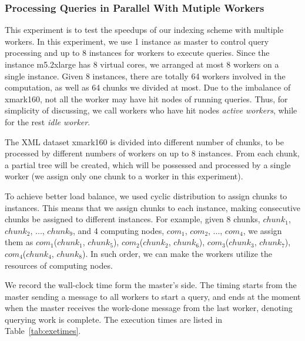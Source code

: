 \subsubsection{Processing Queries in Parallel With Mutiple Workers}

This experiment is to test the speedups of our indexing scheme with multiple
workers. In this experiment, we use 1 instance as master to control query
processing and up to 8 instances for workers to execute queries. Since the
instance m5.2xlarge has 8 virtual cores, we arranged at most 8 workers on a
single instance. Given 8 instances, there are totally 64 workers involved in the
computation, as well as 64 chunks we divided at most. Due to the imbalance of
xmark160, not all the worker may have hit nodes of running queries. Thus, for
simplicity of discussing, we call workers who have hit nodes \emph{active
	workers}, while for the rest \emph{idle worker}. 

The XML dataset xmark160 is divided into different number of chunks, to be
processed by different numbers of workers on up to 8 instances. From each chunk,
a partial tree will be created, which will be possessed and processed by a
single worker (we assign only one chunk to a worker in this experiment). 

To achieve better load balance, we used cyclic distribution to assign chunks to
instances. This means that we assign chunks to each instance, making consecutive
chunks be assigned to different instances. For example, given 8 chunks, $chunk_1$,
$chunk_2$, ..., $chunk_9$, and 4 computing nodes, $com_1$, $com_2$, ..., $com_4$, 
we assign them as 
$com_1$($chunk_1$, $chunk_5$), 
$com_2$($chunk_2$, $chunk_6$), 
$com_3$($chunk_3$, $chunk_7$), 
$com_4$($chunk_4$, $chunk_8$). 
In such order, we can make the workers utilize the resources of computing nodes. 

We record the wall-clock time form the master's side. The timing starts from the
master sending a message to all workers to start a query, and ends at the moment
when the master receives the work-done message from the last worker, denoting
querying work is complete. The execution times are listed in
Table~\ref{tab:exetimes}.



